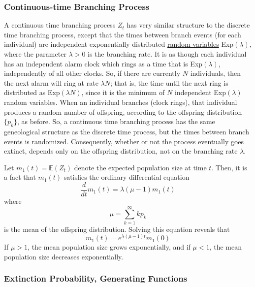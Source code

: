  \subsubsection{Continuous-time Branching Process}

    A continuous time branching process $Z_t$ has very similar structure to the discrete time branching process, except that the times between branch events (for each individual) are independent exponentially distributed \hyperref[def:random-variable]{random variables} Exp$(\lambda)$, where the parameter $\lambda> 0$ is the branching rate. It is as though each individual has an independent alarm clock which rings as a time that is Exp$(\lambda)$, independently of all other clocks. So, if there are currently $N$ individuals, then the next alarm will ring at rate $\lambda N$; that is, the time until the next ring is distributed as Exp$(\lambda N)$, since it is the minimum of $N$ independent Exp$(\lambda)$ random variables. When an individual branches (clock rings), that individual produces a random number of offspring, according to the offspring distribution $\{p_k\}$, as before. So, a continuous time branching process has the same geneological structure as the discrete time process, but the times between branch events is randomized. Consequently, whether or not the process eventually goes extinct, depends only on the offspring distribution, not on the branching rate $\lambda$. 

    Let $m_1(t) = \mathbb{E}(Z_t)$ denote the expected population size at time $t$. Then, it is a fact that $m_1(t)$ satisfies the ordinary differential equation
    \begin{equation}
      \frac{d}{d t} m_1 (t) = \lambda(\mu - 1) m_1 (t)
    \end{equation}
    where 
    \begin{equation}
      \mu = \sum_{k=1}^\infty k p_k
    \end{equation}
    is the mean of the offspring distribution. Solving this equation reveals that 
    \begin{equation}
      m_1 (t) = e^{\lambda (\mu-1) t} m_1 (0)
    \end{equation}
    If $\mu > 1$, the mean population size grows exponentially, and if $\mu < 1$, the mean population size decreases exponentially. 

  \subsubsection{Extinction Probability, Generating Functions}

